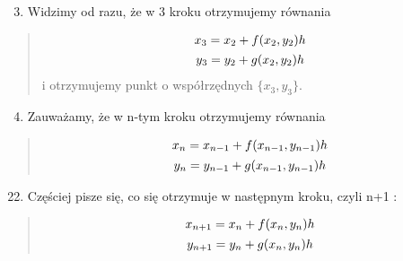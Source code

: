 \documentclass[a4paper,12pt,polish]{sphinxmanual}
\begin{document}
\begin{enumerate}
\setcounter{enumi}{2}
\item {} 
Widzimy od razu, że w 3 kroku otrzymujemy równania

\end{enumerate}
\begin{quote}
\label{ch1/chI021:equation-eqn46}\begin{gather}
\begin{split}x_3 =  x_2 + f(x_2, y_2) h\end{split}\label{ch1/chI021-eqn46}\\\begin{split}y_3 =  y_2 + g(x_2, y_2) h\end{split}\notag
\end{gather}
i otrzymujemy punkt o współrzędnych $\{x_3, y_3\}$.
\end{quote}
\begin{enumerate}
\setcounter{enumi}{3}
\item {} 
Zauważamy, że w n-tym kroku otrzymujemy równania

\end{enumerate}
\begin{quote}
\label{ch1/chI021:equation-eqn48}\begin{gather}
\begin{split}x_n =  x_{n-1} + f(x_{n-1}, y_{n-1}) h\end{split}\label{ch1/chI021-eqn48}\\\begin{split}y_n =  y_{n-1} + g(x_{n-1}, y_{n-1}) h\end{split}\notag
\end{gather}\end{quote}
\begin{enumerate}
\setcounter{enumi}{21}
\item {} 
Częściej pisze się, co się otrzymuje w następnym kroku, czyli n+1 :

\end{enumerate}
\begin{quote}
\label{ch1/chI021:equation-eqn50}\begin{gather}
\begin{split}x_{n+1} =  x_n + f(x_n, y_n) h\end{split}\label{ch1/chI021-eqn50}\\\begin{split}y_{n+1} =  y_n + g(x_n, y_n) h\end{split}\notag
\end{gather}\end{quote}
\end{document}
